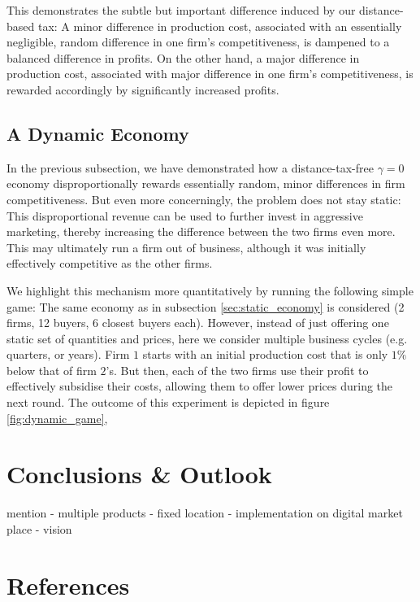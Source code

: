 \documentclass[final,3p,times,authoryear,12pt]{elsarticle}
\newcommand{\red}[1]{\textcolor{WildStrawberry}{#1}} %
\begin{document}
This demonstrates the subtle but important difference induced by our distance-based tax:
A minor difference in production cost, associated with an essentially negligible, random difference in one firm's competitiveness, is dampened to a balanced difference in profits. 
On the other hand, a major difference in production cost, associated with major difference in one firm's competitiveness, is rewarded accordingly by significantly increased profits. 


\subsection{A Dynamic Economy} 

In the previous subsection, we have demonstrated how a distance-tax-free $\gamma=0$ economy disproportionally rewards essentially random, minor differences in firm competitiveness. 
But even more concerningly, the problem does not stay static: 
This disproportional revenue can be used to further invest in aggressive marketing, thereby increasing the difference between the two firms even more. 
This may ultimately run a firm out of business, although it was initially effectively competitive as the other firms. 

We highlight this mechanism more quantitatively by running the following simple game:
The same economy as in subsection \ref{sec:static_economy} is considered (2 firms, 12 buyers, 6 closest buyers each). 
However, instead of just offering one static set of quantities and prices, here we consider multiple business cycles (e.g. quarters, or years). 
Firm $1$ starts with an initial production cost that is only $1\%$ below that of firm $2$'s. 
But then, each of the two firms use their profit to effectively subsidise their costs, allowing them to offer lower prices during the next round. 
The outcome of this experiment is depicted in figure \ref{fig:dynamic_game}, 


\section{Conclusions \& Outlook}
\label{sec:conclusions} 

\red{
mention
- multiple products
- fixed location
- implementation on digital market place
- vision
} 

\section*{References}


\end{document}
